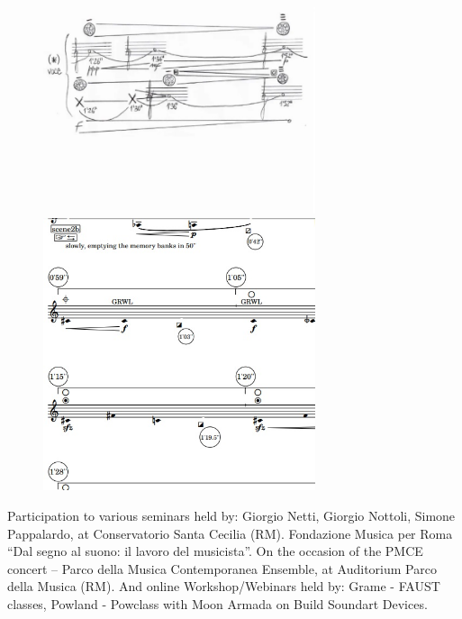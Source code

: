 \documentclass[12pt,landscape]{article}
\begin{document}
{\begin{center}
\begin{figure}[!htb]
\endminipage\hfill
{}%
  \includegraphics[width=8cm]{threestudies1.jpg}

\endminipage\hfill
{}%
  \includegraphics[width=8cm]{deusex1.jpg}

\endminipage
\end{figure}

Participation to various seminars 
\newline
held by: Giorgio Netti, Giorgio Nottoli,
Simone Pappalardo, at Conservatorio Santa Cecilia (RM).
\newline
Fondazione Musica per Roma
“Dal segno al suono: il lavoro del musicista”. On the occasion of the PMCE concert – Parco della
Musica Contemporanea Ensemble, at Auditorium Parco della Musica (RM).
\newline
And online Workshop/Webinars held by: Grame - FAUST classes, 
Powland - Powclass with Moon Armada on Build Soundart Devices.

\clearpage



\end{center}}
\end{document}
